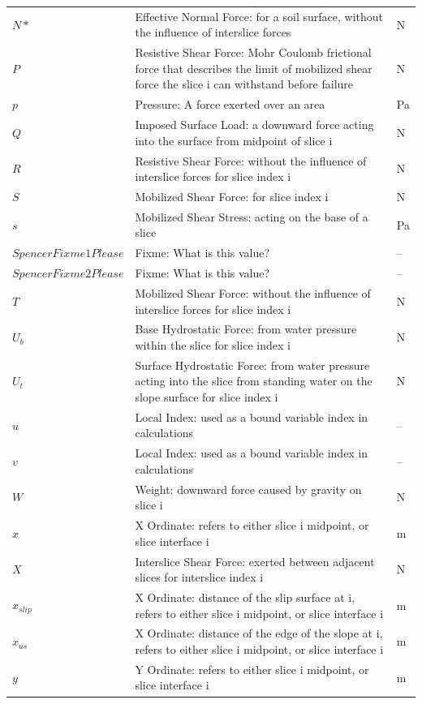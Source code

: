 \documentclass[12pt]{article}
\begin{document}
\begin{longtabu}{l X[l] l}
\\
$N*$ & Effective Normal Force: for a soil surface, without the influence of interslice forces & N
\\
$P$ & Resistive Shear Force: Mohr Coulomb frictional force that describes the limit of mobilized shear force the slice i can withstand before failure & N
\\
$p$ & Pressure: A force exerted over an area & Pa
\\
$Q$ & Imposed Surface Load: a downward force acting into the surface from midpoint of slice i & N
\\
$R$ & Resistive Shear Force: without the influence of interslice forces for slice index i & N
\\
$S$ & Mobilized Shear Force: for slice index i & N
\\
$s$ & Mobilized Shear Stress: acting on the base of a slice & Pa
\\
$SpencerFixme1Please$ & Fixme: What is this value? & --
\\
$SpencerFixme2Please$ & Fixme: What is this value? & --
\\
$T$ & Mobilized Shear Force: without the influence of interslice forces for slice index i & N
\\
${U_{b}}$ & Base Hydrostatic Force: from water pressure within the slice for slice index i & N
\\
${U_{t}}$ & Surface Hydrostatic Force: from water pressure acting into the slice from standing water on the slope surface for slice index i & N
\\
$u$ & Local Index: used as a bound variable index in calculations & --
\\
$v$ & Local Index: used as a bound variable index in calculations & --
\\
$W$ & Weight: downward force caused by gravity on slice i & N
\\
$x$ & X Ordinate: refers to either slice i midpoint, or slice interface i & m
\\
$X$ & Interslice Shear Force: exerted between adjacent slices for interslice index i & N
\\
${x_{slip}}$ & X Ordinate: distance of the slip surface at i, refers to either slice i midpoint, or slice interface i & m
\\
${x_{us}}$ & X Ordinate: distance of the edge of the slope at i, refers to either slice i midpoint, or slice interface i & m
\\
$y$ & Y Ordinate: refers to either slice i midpoint, or slice interface i & m

\end{longtabu}
\end{document}
